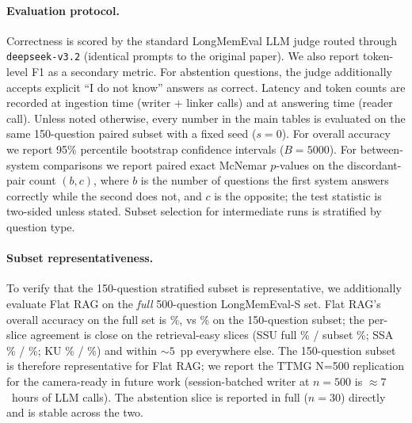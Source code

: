 \paragraph{Evaluation protocol.}
Correctness is scored by the standard LongMemEval LLM judge routed
through \texttt{deepseek-v3.2} (identical prompts to the original
paper). We also report token-level F1 as a secondary metric. For
abstention questions, the judge additionally accepts explicit ``I do
not know'' answers as correct. Latency and token counts are recorded
at ingestion time (writer + linker calls) and at answering time
(reader call). Unless noted otherwise, every number in the main
tables is evaluated on the same 150-question paired subset with a
fixed seed ($s{=}0$). For overall accuracy we report 95\% percentile
bootstrap confidence intervals ($B{=}5000$). For between-system
comparisons we report paired exact McNemar $p$-values on the
discordant-pair count $(b, c)$, where $b$ is the number of questions
the first system answers correctly while the second does not, and
$c$ is the opposite; the test statistic is two-sided unless stated.
Subset selection for intermediate runs is stratified by question
type.

\paragraph{Subset representativeness.}
To verify that the 150-question stratified subset is representative,
we additionally evaluate Flat RAG on the \emph{full} 500-question
LongMemEval-S set. Flat RAG's overall accuracy on the full set is
\FlatFullAcc\%, vs \FlatLMEAcc\% on the 150-question subset; the
per-slice agreement is close on the retrieval-easy slices
(SSU full \FlatFullSSU\% / subset \FlatLMEAccSSU\%; SSA
\FlatFullSSA\% / \FlatLMEAccSSA\%; KU \FlatFullKU\% /
\FlatLMEAccKU\%) and within ${\sim}5$~pp everywhere else. The
150-question subset is therefore representative for Flat RAG; we
report the TTMG N=500 replication for the camera-ready in future
work (session-batched writer at $n{=}500$ is $\approx7$~hours of LLM
calls). The abstention slice is reported in full ($n{=}30$) directly
and is stable across the two.

